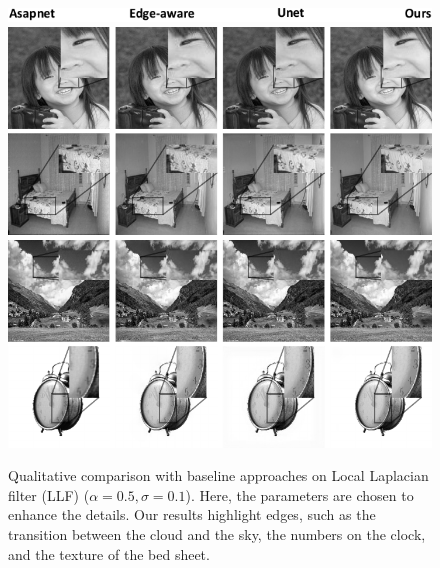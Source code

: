 
\begin{figure}%
  \centering
    \includegraphics[width=.82\linewidth]{Chapters/detail-retouching-figs/One-shot-labels.pdf}
  \includegraphics[width=\linewidth]{Chapters/detail-retouching-figs/Qualitative_zoomed_LLF_a05_s01.pdf}
    \caption{Qualitative comparison with baseline approaches on Local Laplacian filter (LLF) ($\alpha=0.5, \sigma=0.1$). Here, the parameters are chosen to enhance the details. Our results highlight edges, such as the transition between the cloud and the sky, the numbers on the clock, and the texture of the bed sheet.} 

   \label{fig:QualitativeComp_LLF_a05}%
\end{figure}
